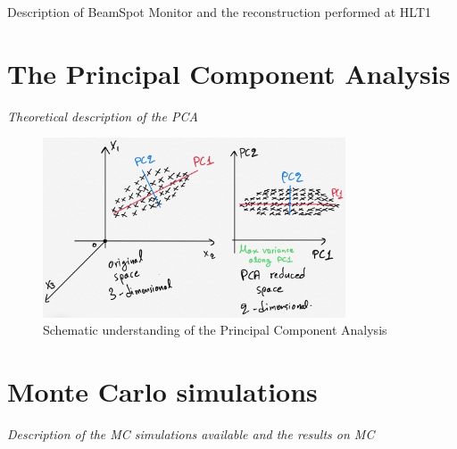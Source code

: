 Description of BeamSpot Monitor and the reconstruction performed at HLT1

\section{The Principal Component Analysis}
\textit{Theoretical description of the PCA}

\begin{figure}
    \centering
    \includegraphics[width=0.8\textwidth]{figures/pca.jpg}
    \caption{Schematic understanding of the Principal Component Analysis}
    \label{fig:pca}
\end{figure}


\section{Monte Carlo simulations}
\textit{Description of the MC simulations available and the results on MC}

